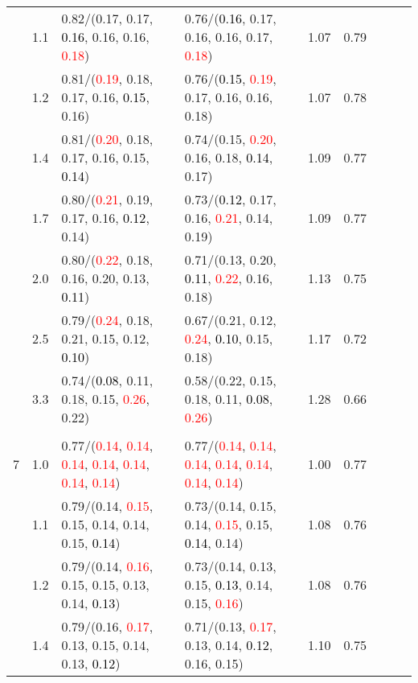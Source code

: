 \documentclass[10pt,a4paper]{report}
\begin{document}
\begin{table}[!htbp]
\begin{center}
{\begin{tabular}{ccllccccc}
			&1.1&0.82/(0.17, 0.17, \textcolor{black}{0.16}, 0.16, 0.16, \textcolor{red}{0.18})&0.76/(\textcolor{black}{0.16}, 0.17, 0.16, 0.16, 0.17, \textcolor{red}{0.18})&1.07&0.79\\
			&1.2&0.81/(\textcolor{red}{0.19}, 0.18, 0.17, 0.16, \textcolor{black}{0.15}, 0.16)&0.76/(\textcolor{black}{0.15}, \textcolor{red}{0.19}, 0.17, 0.16, 0.16, 0.18)&1.07&0.78\\
			&1.4&0.81/(\textcolor{red}{0.20}, 0.18, 0.17, 0.16, 0.15, \textcolor{black}{0.14})&0.74/(0.15, \textcolor{red}{0.20}, 0.16, 0.18, \textcolor{black}{0.14}, 0.17)&1.09&0.77\\
			&1.7&0.80/(\textcolor{red}{0.21}, 0.19, 0.17, 0.16, \textcolor{black}{0.12}, 0.14)&0.73/(\textcolor{black}{0.12}, 0.17, 0.16, \textcolor{red}{0.21}, 0.14, 0.19)&1.09&0.77\\
			&2.0&0.80/(\textcolor{red}{0.22}, 0.18, 0.16, 0.20, 0.13, \textcolor{black}{0.11})&0.71/(0.13, 0.20, \textcolor{black}{0.11}, \textcolor{red}{0.22}, 0.16, 0.18)&1.13&0.75\\
			&2.5&0.79/(\textcolor{red}{0.24}, 0.18, 0.21, 0.15, 0.12, \textcolor{black}{0.10})&0.67/(0.21, 0.12, \textcolor{red}{0.24}, \textcolor{black}{0.10}, 0.15, 0.18)&1.17&0.72\\
			&3.3&0.74/(\textcolor{black}{0.08}, 0.11, 0.18, 0.15, \textcolor{red}{0.26}, 0.22)&0.58/(0.22, 0.15, 0.18, 0.11, \textcolor{black}{0.08}, \textcolor{red}{0.26})&1.28&0.66\\
			&&&&\\
			7			&1.0&0.77/(\textcolor{red}{0.14}, \textcolor{red}{0.14}, \textcolor{red}{0.14}, \textcolor{red}{0.14}, \textcolor{red}{0.14}, \textcolor{red}{0.14}, \textcolor{red}{0.14})&0.77/(\textcolor{red}{0.14}, \textcolor{red}{0.14}, \textcolor{red}{0.14}, \textcolor{red}{0.14}, \textcolor{red}{0.14}, \textcolor{red}{0.14}, \textcolor{red}{0.14})&1.00&0.77\\
			&1.1&0.79/(0.14, \textcolor{red}{0.15}, 0.15, 0.14, 0.14, 0.15, \textcolor{black}{0.14})&0.73/(0.14, 0.15, 0.14, \textcolor{red}{0.15}, 0.15, \textcolor{black}{0.14}, 0.14)&1.08&0.76\\
			&1.2&0.79/(0.14, \textcolor{red}{0.16}, 0.15, 0.15, 0.13, 0.14, \textcolor{black}{0.13})&0.73/(0.14, 0.13, 0.15, \textcolor{black}{0.13}, 0.14, 0.15, \textcolor{red}{0.16})&1.08&0.76\\
			&1.4&0.79/(0.16, \textcolor{red}{0.17}, 0.13, 0.15, 0.14, 0.13, \textcolor{black}{0.12})&0.71/(0.13, \textcolor{red}{0.17}, 0.13, 0.14, \textcolor{black}{0.12}, 0.16, 0.15)&1.10&0.75\\

\end{tabular}}
\end{center}
\end{table}
\end{document}
